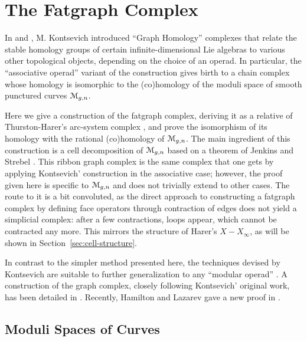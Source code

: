 

\chapter{The Fatgraph Complex}
\label{cha:ribbon-graph-complex}

In \cite{kontsevich;1993} and \cite{kontsevich;feynman}, M. Kontsevich
introduced ``Graph Homology'' complexes that relate the stable
homology groups of certain infinite-dimensional Lie algebras to
various other topological objects, depending on the choice of an
operad.  In particular, the ``associative operad'' variant of the
construction gives birth to a chain complex whose homology is
isomorphic to the (co)homology of the moduli space of smooth punctured
curves $\mathcal{M}_{g,n}$.

Here we give a construction of the fatgraph complex, deriving it
as a relative of Thurston-Harer's arc-system complex \cite{%
  harer;cohomological-dimension,%
  harer;cohomology-of-moduli%
},
and prove the isomorphism of its homology with the
rational (co)homology of $\mathcal{M}_{g,n}$.  The main ingredient of this
construction is a cell decomposition of $\mathcal{M}_{g,n}$ based on a theorem
of Jenkins and Strebel \cite{strebel;quadratic-differentials;1983}.
This ribbon graph complex is the same complex that one gets by
applying Kontsevich' construction in the associative case; however,
the proof given here is specific to $\mathcal{M}_{g,n}$ and does not trivially
extend to other cases.  The route to it is a bit convoluted, as the
direct approach to constructing a fatgraph complex by defining
face operators through contraction of edges does not yield a
simplicial complex: after a few contractions, loops appear, which
cannot be contracted any more.  This mirrors the structure of Harer's
$X - X_\infty$, as will be shown in Section~\ref{sec:cell-structure}.

In contrast to the simpler method presented here, the techniques
devised by Kontsevich are suitable to further generalization to any
``modular operad'' \cite{getzler-kapranov}.  A construction of the
graph complex, closely following Kontsevich' original work, has been
detailed in \cite{conant-vogtmann;2003}. Recently, Hamilton and
Lazarev gave a new proof in \cite{hamilton-lazarev;math.QA/0608395}.




\section{Moduli Spaces of Curves}
\label{sec:moduli-spaces}


